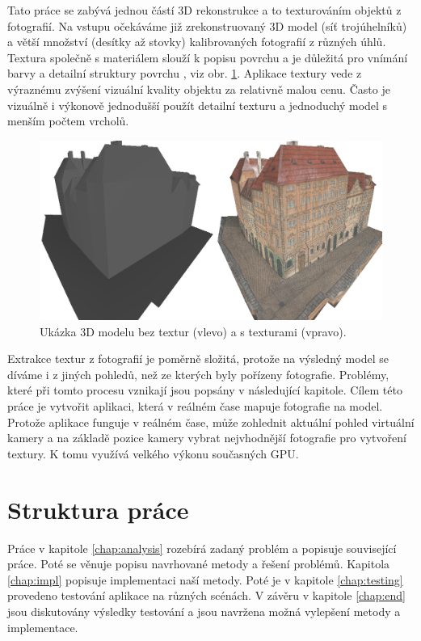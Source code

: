 \documentclass[11pt,twoside,a4paper]{book}
\begin{document}
Tato práce se zabývá jednou částí 3D rekonstrukce a to texturováním objektů z
fotografií. Na vstupu očekáváme již zrekonstruovaný 3D model (síť trojúhelníků)
a větší množství (desítky až stovky) kalibrovaných fotografií z různých úhlů. Textura společně s materiálem slouží k popisu povrchu a je důležitá pro vnímání barvy a detailní struktury povrchu \cite{mpg}, viz obr. \ref{fig:example}. Aplikace textury vede z výraznému zvýšení vizuální kvality objektu za relativně malou cenu.  Často je vizuálně i výkonově jednodušší použít detailní texturu a jednoduchý model s menším počtem vrcholů.

\begin{figure}[h]
\begin{center}
\includegraphics[width=\textwidth]{figures/example}
\caption{Ukázka 3D modelu bez textur (vlevo) a s texturami (vpravo).}
\label{fig:example}
\end{center}
\end{figure}

Extrakce textur z fotografií je poměrně složitá, protože 	na výsledný model se díváme i z jiných pohledů, než ze kterých byly pořízeny fotografie. Problémy, které při tomto procesu vznikají jsou popsány v následující kapitole. Cílem této práce je vytvořit aplikaci, která v reálném čase mapuje fotografie na model. Protože aplikace funguje v reálném čase, může zohlednit aktuální pohled virtuální kamery a na základě pozice kamery vybrat nejvhodnější fotografie pro vytvoření textury. K tomu využívá velkého výkonu současných GPU.

\newpage
\section{Struktura práce}

Práce v kapitole \ref{chap:analysis} rozebírá zadaný problém a popisuje související práce. Poté se věnuje popisu navrhované metody a řešení problémů. Kapitola \ref{chap:impl} popisuje implementaci naší metody. Poté je v kapitole \ref{chap:testing} provedeno testování aplikace na různých scénách. V závěru v kapitole \ref{chap:end} jsou diskutovány výsledky testování a jsou navržena možná vylepšení metody a implementace.
\end{document}
